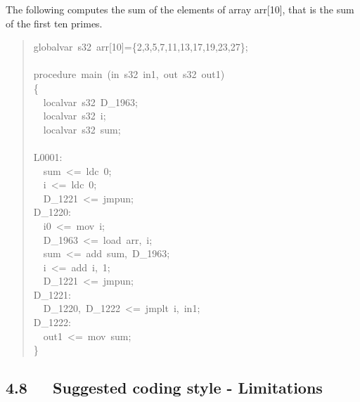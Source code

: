 \documentclass[a4paper]{article}
\begin{document}
The following computes the sum of the elements of array arr{[}10{]}, that is the
sum of the first ten primes.
%
\begin{quote}{\ttfamily \raggedright \noindent
globalvar~s32~arr{[}10{]}=\{2,3,5,7,11,13,17,19,23,27\};\\
~\\
procedure~main~(in~s32~in1,~out~s32~out1)\\
\{\\
~~localvar~s32~D\_1963;\\
~~localvar~s32~i;\\
~~localvar~s32~sum;\\
~\\
L0001:\\
~~sum~<=~ldc~0;\\
~~i~<=~ldc~0;\\
~~D\_1221~<=~jmpun;\\
D\_1220:\\
~~i0~<=~mov~i;\\
~~D\_1963~<=~load~arr,~i;\\
~~sum~<=~add~sum,~D\_1963;\\
~~i~<=~add~i,~1;\\
~~D\_1221~<=~jmpun;\\
D\_1221:\\
~~D\_1220,~D\_1222~<=~jmplt~i,~in1;\\
D\_1222:\\
~~out1~<=~mov~sum;\\
\}
}
\end{quote}


\subsection{4.8~~~Suggested coding style - Limitations%
  \label{suggested-coding-style-limitations}%
}
\end{document}
